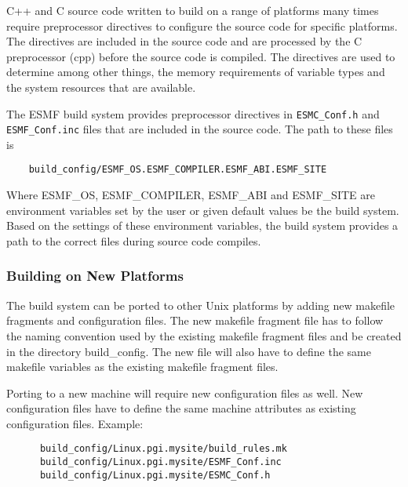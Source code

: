 C++ and C source code written to build on a range of platforms many
times require preprocessor directives to configure the source code for
specific platforms.  The directives are included in the source code
and are processed by the C preprocessor (cpp) before the source code
is compiled.  The directives are used to determine among other things,
the memory requirements of variable types and the system resources
that are available.

The ESMF build system provides preprocessor directives in 
{\tt ESMC\_Conf.h} and {\tt ESMF\_Conf.inc} files
that are included in the source code.  The path to these files is

\begin{verbatim}
    build_config/ESMF_OS.ESMF_COMPILER.ESMF_ABI.ESMF_SITE
\end{verbatim}

Where ESMF\_OS, ESMF\_COMPILER, ESMF\_ABI and ESMF\_SITE are
environment variables set by the user or given default values be the
build system.  Based on the settings of these environment variables,
the build system provides a path to the correct files during
source code compiles.

\subsubsection{Building on New Platforms}

The build system can be ported to other Unix platforms by adding new
makefile fragments and configuration files.  The new makefile fragment 
file has to follow the naming
convention used by the existing makefile fragment files and be created in the
directory build\_config.  The new file will also have to define
the same makefile variables as the existing makefile fragment files.

Porting to a new machine will require new configuration files as well. 
New configuration files have to define the same machine attributes as
existing configuration files. Example:

\begin{verbatim}
      build_config/Linux.pgi.mysite/build_rules.mk
      build_config/Linux.pgi.mysite/ESMF_Conf.inc
      build_config/Linux.pgi.mysite/ESMC_Conf.h
\end{verbatim}

